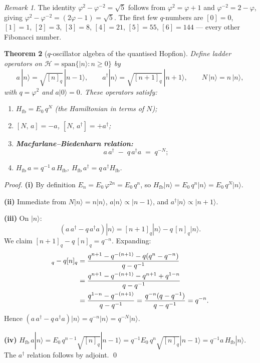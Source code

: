 \documentclass[11pt,a4paper]{article}
\newtheorem{theorem}{Theorem}[section]
\theoremstyle{definition}
\theoremstyle{remark}
\newtheorem{remark}[theorem]{Remark}
\newcommand{\vp}{\varphi}
\newcommand{\Hil}{\mathcal{H}}
\begin{document}
\begin{remark}
\label{P10:rem:qnumber_identity}
The identity $\vp^2 - \vp^{-2} = \sqrt{5}$ follows from
$\vp^2 = \vp+1$ and $\vp^{-2} = 2-\vp$, giving
$\vp^2-\vp^{-2} = (2\vp-1) = \sqrt{5}$.
The first few $q$-numbers are $[0]=0$, $[1]=1$, $[2]=3$, $[3]=8$,
$[4]=21$, $[5]=55$, $[6]=144$ --- every other Fibonacci number.
\end{remark}

\begin{theorem}[$q$-oscillator algebra of the quantised Hopfion]
\label{P10:thm:q_algebra}
Define ladder operators on $\Hil = \mathrm{span}\{|n\rangle : n\geq0\}$ by
\begin{equation}
  a\,|n\rangle = \sqrt{[n]_q}\,|n-1\rangle,
  \qquad
  a^\dagger|n\rangle = \sqrt{[n+1]_q}\,|n+1\rangle,
  \qquad
  N\,|n\rangle = n\,|n\rangle,
  \label{P10:eq:ladder_def}
\end{equation}
with $q = \vp^2$ and $a|0\rangle = 0$.
These operators satisfy:
\begin{enumerate}[label=(\roman*),noitemsep]
\item $H_\mathrm{fb} = E_0\,q^N$ \quad (the Hamiltonian in terms of $N$);
\item $[N,\,a] = -a$, \quad $[N,\,a^\dagger] = +a^\dagger$;
\item \textbf{Macfarlane--Biedenharn relation:}
  \begin{equation}
    \boxed{a\,a^\dagger \;-\; q\,a^\dagger a
    \;=\; q^{-N}};
    \label{P10:eq:qosc}
  \end{equation}
\item $H_\mathrm{fb}\,a = q^{-1}\,a\,H_\mathrm{fb}$,
  \quad $H_\mathrm{fb}\,a^\dagger = q\,a^\dagger H_\mathrm{fb}$.
\end{enumerate}
\end{theorem}

\begin{proof}
\textbf{(i)} By definition $E_n = E_0\,\vp^{2n} = E_0\,q^n$,
so $H_\mathrm{fb}|n\rangle = E_0\,q^n|n\rangle = E_0\,q^N|n\rangle$.

\textbf{(ii)} Immediate from $N|n\rangle = n|n\rangle$,
$a|n\rangle\propto|n-1\rangle$, and $a^\dagger|n\rangle\propto|n+1\rangle$.

\textbf{(iii)} On $|n\rangle$:
\[
  (a\,a^\dagger - q\,a^\dagger a)|n\rangle
  = [n+1]_q|n\rangle - q\,[n]_q|n\rangle.
\]
We claim $[n+1]_q - q\,[n]_q = q^{-n}$.
Expanding:
\begin{align}
  [n+1]_q - q[n]_q
  &= \frac{q^{n+1}-q^{-(n+1)}-q(q^n-q^{-n})}{q-q^{-1}} \notag\\
  &= \frac{q^{n+1}-q^{-(n+1)}-q^{n+1}+q^{1-n}}{q-q^{-1}} \notag\\
  &= \frac{q^{1-n}-q^{-(n+1)}}{q-q^{-1}}
   = \frac{q^{-n}(q-q^{-1})}{q-q^{-1}}
   = q^{-n}. \label{P10:eq:q_identity}
\end{align}
Hence $(a\,a^\dagger - q\,a^\dagger a)|n\rangle = q^{-n}|n\rangle = q^{-N}|n\rangle$.

\textbf{(iv)} $H_\mathrm{fb}\,a|n\rangle
= E_0\,q^{n-1}\sqrt{[n]_q}|n-1\rangle
= q^{-1}E_0\,q^n\sqrt{[n]_q}|n-1\rangle
= q^{-1}a\,H_\mathrm{fb}|n\rangle$.
The $a^\dagger$ relation follows by adjoint.
\qed
\end{proof}
\end{document}
